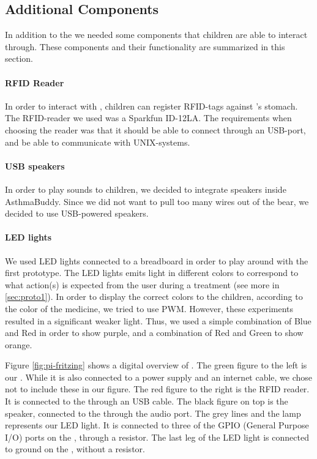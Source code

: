   
\subsection{Additional Components}
In addition to the \rpi{} we needed some components that children are able to interact through. These components and their functionality are summarized in this section. 


\paragraph{RFID Reader}
In order to interact with \ab{}, children can register RFID-tags against \ab{}'s stomach. The RFID-reader we used was a Sparkfun ID-12LA. The requirements when choosing the reader was that it should be able to connect through an USB-port, and be able to communicate with UNIX-systems.
         
\paragraph{USB speakers}
In order to play sounds to children, we decided to integrate speakers inside AsthmaBuddy. Since we did not want to pull too many wires out of the bear, we decided to use USB-powered speakers.    

\paragraph{LED lights}
We used LED lights connected to a breadboard in order to play around with the first prototype. The LED lights emits light in different colors to correspond to what action(s) is expected from the user during a treatment (see more in \ref{sec:proto1}). In order to display the correct colors to the children, according to the color of the medicine, we tried to use PWM. However, these experiments resulted in a significant weaker light. Thus, we used a simple combination of Blue and Red in order to show purple, and a combination of Red and Green to show orange.  
 
Figure \ref{fig:pi-fritzing} shows a digital overview of \buddy{}. The green figure to the left is our \rpi{}. While it is also connected to a power supply and an internet cable, we chose not to include these in our figure. The red figure to the right is the RFID reader. It is connected to the \rpi{} through an USB cable. The black figure on top is the speaker, connected to the \rpi{} through the audio port. 
The grey lines and the lamp represents our LED light. It is connected to three of the GPIO (General Purpose I/O) ports on the \rpi{}, through a resistor. The last leg of the LED light is connected to ground on the \rpi{}, without a resistor.

